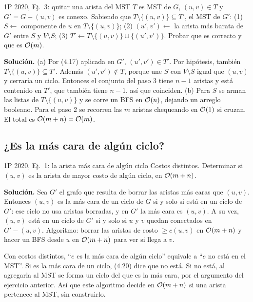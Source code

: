 \begin{problema}{1P 2020, Ej.~3: quitar una arista del MST}
$T$ es MST de $G$, $(u,v)\in T$ y $G'=G-(u,v)$ es conexo. Sabiendo que $T\setminus\{(u,v)\}\subseteq T'$, el MST de $G'$: (1) $S\gets$ componente de $u$ en $T\setminus\{(u,v)\}$; (2) $(u',v')\gets$ la arista más barata de $G'$ entre $S$ y $V\setminus S$; (3) $T'\gets T\setminus\{(u,v)\}\cup\{(u',v')\}$. Probar que es correcto y que es $\mathcal{O}(m)$.

\smallskip
\textbf{Solución.} (a) Por (4.17) aplicada en $G'$, $(u',v')\in T'$. Por hipótesis, también $T\setminus\{(u,v)\}\subseteq T'$. Además $(u',v')\notin T$, porque une $S$ con $V\setminus S$ igual que $(u,v)$ y cerraría un ciclo. Entonces el conjunto del paso 3 tiene $n-1$ aristas y está contenido en $T'$, que también tiene $n-1$, así que coinciden. (b) Para $S$ se arman las listas de $T\setminus\{(u,v)\}$ y se corre un BFS en $\mathcal{O}(n)$, dejando un arreglo booleano. Para el paso 2 se recorren las $m$ aristas chequeando en $\mathcal{O}(1)$ si cruzan. El total es $\mathcal{O}(m+n)=\mathcal{O}(m)$.
\end{problema}

\subsection{¿Es la más cara de algún ciclo?}

\begin{problema}{1P 2020, Ej.~1: la arista más cara de algún ciclo}
Costos distintos. Determinar si $(u,v)$ es la arista de mayor costo de algún ciclo, en $\mathcal{O}(m+n)$.

\smallskip
\textbf{Solución.} Sea $G'$ el grafo que resulta de borrar las aristas más caras que $(u,v)$. Entonces $(u,v)$ es la más cara de un ciclo de $G$ si y solo si está en un ciclo de $G'$: ese ciclo no usa aristas borradas, y en $G'$ la más cara es $(u,v)$. A su vez, $(u,v)$ está en un ciclo de $G'$ si y solo si $u$ y $v$ quedan conectados en $G'-(u,v)$. Algoritmo: borrar las aristas de costo $\ge c(u,v)$ en $\mathcal{O}(m+n)$ y hacer un BFS desde $u$ en $\mathcal{O}(m+n)$ para ver si llega a $v$.
\end{problema}

Con costos distintos, ``$e$ es la más cara de algún ciclo'' equivale a ``$e$ no está en el MST''. Si es la más cara de un ciclo, (4.20) dice que no está. Si no está, al agregarla al MST se forma un ciclo del que es la más cara, por el argumento del ejercicio anterior. Así que este algoritmo decide en $\mathcal{O}(m+n)$ si una arista pertenece al MST, sin construirlo.

